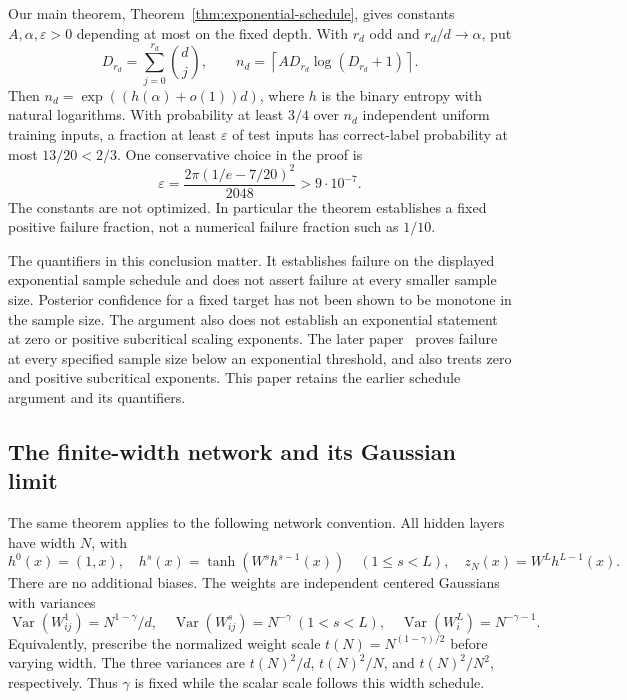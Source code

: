 \documentclass[11pt]{article}
\theoremstyle{remark}\newtheorem{remark}[theorem]{Remark}
\DeclareMathOperator{\Var}{Var}
\begin{document}
Our main theorem, Theorem~\ref{thm:exponential-schedule}, gives constants
$A,\alpha,\varepsilon>0$ depending at most on the fixed depth. With
$r_d$ odd and $r_d/d\to\alpha$, put
\begin{equation}\label{eq:paper-schedule}
 D_{r_d}=\sum_{j=0}^{r_d}\binom dj,
 \qquad n_d=\left\lceil A D_{r_d}\log(D_{r_d}+1)\right\rceil.
\end{equation}
Then $n_d=\exp((h(\alpha)+o(1))d)$, where $h$ is the binary entropy
with natural logarithms. With probability at least $3/4$ over $n_d$
independent uniform training inputs, a fraction at least $\varepsilon$
of test inputs has correct-label probability at most $13/20<2/3$.
One conservative choice in the proof is
\[
 \varepsilon=\frac{2\pi(1/e-7/20)^2}{2048}>9\cdot10^{-7}.
\]
The constants are not optimized. In particular the theorem establishes
a fixed positive failure fraction, not a numerical failure fraction
such as $1/10$.

The quantifiers in this conclusion matter. It establishes failure on
the displayed exponential sample schedule and does not assert failure
at every smaller sample size. Posterior confidence for a fixed target
has not been shown to be monotone in the sample size. The argument also
does not establish an exponential statement at zero or positive
subcritical scaling exponents. The later paper~\cite{gaussian-all-n} proves failure at every specified
sample size below an exponential threshold, and
\cite{subcritical-exponential} also treats zero and positive subcritical
exponents. This paper retains the earlier schedule argument and its
quantifiers.

\subsection{The finite-width network and its Gaussian limit}
The same theorem applies to the following network convention. All
hidden layers have width $N$, with
\[
 h^0(x)=(1,x),\quad
 h^s(x)=\tanh(W^s h^{s-1}(x))\quad(1\le s<L),\quad
 z_N(x)=W^L h^{L-1}(x).
\]
There are no additional biases. The weights are independent centered
Gaussians with variances
\begin{equation}\label{eq:paper-weights}
 \Var(W^1_{ij})=N^{1-\gamma}/d,\quad
 \Var(W^s_{ij})=N^{-\gamma}\ (1<s<L),\quad
 \Var(W^L_i)=N^{-\gamma-1}.
\end{equation}
Equivalently, prescribe the normalized weight scale
$t(N)=N^{(1-\gamma)/2}$ before varying width. The three variances are
$t(N)^2/d$, $t(N)^2/N$, and $t(N)^2/N^2$, respectively.
Thus $\gamma$ is fixed while the scalar scale follows this width schedule.
\end{document}
